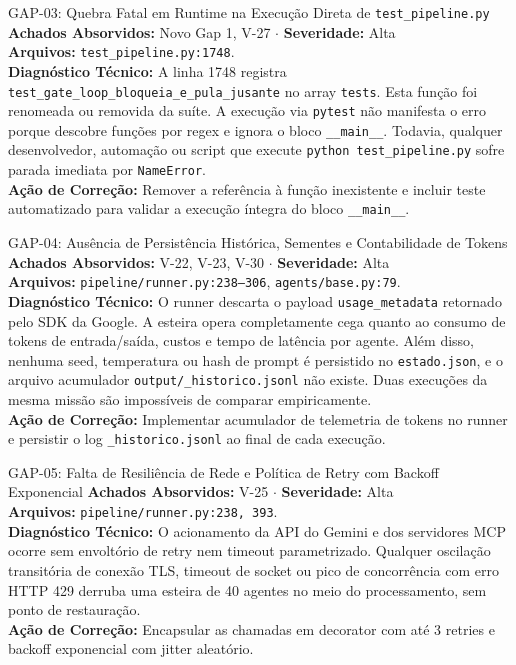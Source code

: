 \documentclass[11pt,a4paper]{article}
\begin{document}
\begin{gapbox}{GAP-03: Quebra Fatal em Runtime na Execução Direta de \texttt{test\_pipeline.py}}
\textbf{Achados Absorvidos:} Novo Gap 1, V-27 $\cdot$ \textbf{Severidade:} Alta\\
\textbf{Arquivos:} \texttt{test\_pipeline.py:1748}.\\
\textbf{Diagnóstico Técnico:} A linha 1748 registra \texttt{test\_gate\_loop\_bloqueia\_e\_pula\_jusante} no array \texttt{tests}. Esta função foi renomeada ou removida da suíte. A execução via \texttt{pytest} não manifesta o erro porque descobre funções por regex e ignora o bloco \texttt{\_\_main\_\_}. Todavia, qualquer desenvolvedor, automação ou script que execute \texttt{python test\_pipeline.py} sofre parada imediata por \texttt{NameError}.\\
\textbf{Ação de Correção:} Remover a referência à função inexistente e incluir teste automatizado para validar a execução íntegra do bloco \texttt{\_\_main\_\_}.
\end{gapbox}

\begin{gapbox}{GAP-04: Ausência de Persistência Histórica, Sementes e Contabilidade de Tokens}
\textbf{Achados Absorvidos:} V-22, V-23, V-30 $\cdot$ \textbf{Severidade:} Alta\\
\textbf{Arquivos:} \texttt{pipeline/runner.py:238--306}, \texttt{agents/base.py:79}.\\
\textbf{Diagnóstico Técnico:} O runner descarta o payload \texttt{usage\_metadata} retornado pelo SDK da Google. A esteira opera completamente cega quanto ao consumo de tokens de entrada/saída, custos e tempo de latência por agente. Além disso, nenhuma seed, temperatura ou hash de prompt é persistido no \texttt{estado.json}, e o arquivo acumulador \texttt{output/\_historico.jsonl} não existe. Duas execuções da mesma missão são impossíveis de comparar empiricamente.\\
\textbf{Ação de Correção:} Implementar acumulador de telemetria de tokens no runner e persistir o log \texttt{\_historico.jsonl} ao final de cada execução.
\end{gapbox}

\begin{gapbox}{GAP-05: Falta de Resiliência de Rede e Política de Retry com Backoff Exponencial}
\textbf{Achados Absorvidos:} V-25 $\cdot$ \textbf{Severidade:} Alta\\
\textbf{Arquivos:} \texttt{pipeline/runner.py:238, 393}.\\
\textbf{Diagnóstico Técnico:} O acionamento da API do Gemini e dos servidores MCP ocorre sem envoltório de retry nem timeout parametrizado. Qualquer oscilação transitória de conexão TLS, timeout de socket ou pico de concorrência com erro HTTP 429 derruba uma esteira de 40 agentes no meio do processamento, sem ponto de restauração.\\
\textbf{Ação de Correção:} Encapsular as chamadas em decorator com até 3 retries e backoff exponencial com jitter aleatório.
\end{gapbox}
\end{document}
